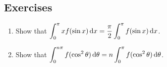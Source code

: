 \subsection*{Exercises}

\begin{enumerate}

    \item Show that $\displaystyle \int_0^\pi xf(\sin x)\,\textrm{d}x = \frac{\pi}{2}\int_0^\pi f(\sin x)\,\textrm{d}x$. \  
    \item Show that $\displaystyle \int_0^{n\pi}f(\cos^2\theta)\,\textrm{d}\theta = n\int_0^\pi f(\cos^2\theta)\,\textrm{d}\theta$.
\end{enumerate}